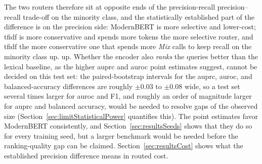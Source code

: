 \documentclass[english, bibtex]{kththesis}               %
\numberwithin{listing}{chapter}
\providecommand{\DIFaddtex}[1]{{\protect\color{blue} \sf #1}} %
\providecommand{\DIFdeltex}[1]{{\protect\color{red} \scriptsize #1}} %
\providecommand{\DIFaddbegin}{} %
\providecommand{\DIFaddend}{} %
\providecommand{\DIFdelbegin}{} %
\providecommand{\DIFdelend}{} %
\providecommand{\DIFadd}[1]{\texorpdfstring{\DIFaddtex{#1}}{#1}} %
\providecommand{\DIFdel}[1]{\texorpdfstring{\DIFdeltex{#1}}{}} %
\begin{document}
\DIFaddend The two routers therefore sit at opposite ends of the \DIFdelbegin \DIFdel{precision-recall }\DIFdelend \DIFaddbegin \DIFadd{precision--recall }\DIFaddend trade-off \DIFaddbegin \DIFadd{on the minority class, and the statistically established part of the difference is on the precision side}\DIFaddend : ModernBERT is \DIFdelbegin \DIFdel{more selective and lower-cost; \gls{tfidf} is more conservative and spends more tokens }\DIFdelend \DIFaddbegin \DIFadd{the more selective router, and \gls{tfidf} the more conservative one that spends more \emph{Mix} calls }\DIFaddend to keep recall \DIFdelbegin \DIFdel{on the minority class up. }\DIFdelend \DIFaddbegin \DIFadd{up. Whether the encoder also \emph{ranks} the queries better than the lexical baseline, as the higher \gls{auprc} and \gls{auroc} point estimates suggest, cannot be decided on this test set: the paired-bootstrap intervals for the \gls{auprc}, \gls{auroc}, and balanced-accuracy differences are roughly $\pm 0.03$ to $\pm 0.08$ wide, so a test set several times larger for \gls{auroc} and F1, and roughly an order of magnitude larger for \gls{auprc} and balanced accuracy, would be needed to resolve gaps of the observed size (Section~\ref{sec:limitStatisticalPower} quantifies this). The point estimates favor ModernBERT consistently, and Section~\ref{sec:resultsSeeds} shows that they do so for every training seed, but a larger benchmark would be needed before the ranking-quality gap can be claimed. Section~\ref{sec:resultsCost} shows what the established precision difference means in routed cost.
}\DIFaddend 
\end{document}
